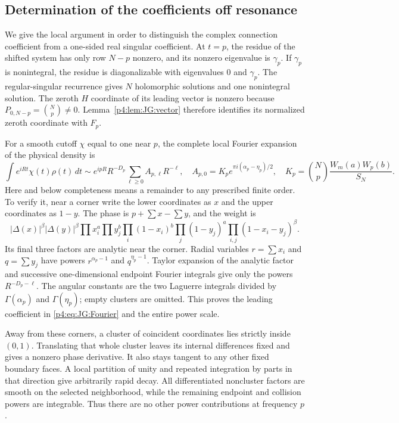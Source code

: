 \documentclass[11pt,a4paper]{article}
\theoremstyle{definition}
\theoremstyle{remark}
\numberwithin{equation}{section}
\begin{document}
\subsection{Determination of the coefficients off resonance}

We give the local argument in order to distinguish the complex
connection coefficient from a one-sided real singular coefficient.
At $t=p$, the residue of the shifted system has only row $N-p$
nonzero, and its nonzero eigenvalue is $\gamma_p$. If $\gamma_p$
is nonintegral, the residue is diagonalizable with eigenvalues
$0$ and $\gamma_p$. The regular-singular recurrence gives $N$
holomorphic solutions and one nonintegral solution.
The zeroth $H$ coordinate of its leading vector is nonzero because
$P_{0,N-p}=\binom Np\ne0$. Lemma~\ref{p4:lem:JG:vector} therefore
identifies its normalized zeroth coordinate with $F_p$.

For a smooth cutoff $\chi$ equal to one near $p$, the complete local
Fourier expansion of the physical density is
\begin{equation}\label{p4:eq:JG:Fourier}
 \int e^{iRt}\chi(t)\rho(t)\,dt
 \sim e^{ipR}R^{-D_p}\sum_{\ell\ge0}A_{p,\ell}R^{-\ell},
 \quad
 A_{p,0}=K_p e^{\pi i(\alpha_p-\eta_p)/2},
 \quad K_p=\binom Np\frac{W_m(a)W_p(b)}{S_N}.
\end{equation}
Here and below completeness means a remainder to any prescribed
finite order. To verify it, near a corner write the lower coordinates
as $x$ and the upper coordinates as $1-y$. The phase is
$p+\sum x-\sum y$, and the weight is
\[
 |\Delta(x)|^\beta|\Delta(y)|^\beta\prod x_i^a\prod y_j^b
 \prod_i(1-x_i)^b\prod_j(1-y_j)^a
                            \prod_{i,j}(1-x_i-y_j)^\beta.
\]
Its final three factors are analytic near the corner. Radial variables
$r=\sum x_i$ and $q=\sum y_j$ have powers $r^{\alpha_p-1}$ and
$q^{\eta_p-1}$. Taylor expansion of the analytic factor and successive
one-dimensional endpoint Fourier integrals give only the powers
$R^{-D_p-\ell}$. The angular constants are the two Laguerre integrals
divided by $\Gamma(\alpha_p)$ and $\Gamma(\eta_p)$; empty clusters
are omitted. This proves the leading coefficient in
\eqref{p4:eq:JG:Fourier} and the entire power scale.

Away from these corners, a cluster of coincident coordinates lies
strictly inside $(0,1)$. Translating that whole cluster leaves its
internal differences fixed and gives a nonzero phase derivative.
It also stays tangent to any other fixed boundary faces.
A local partition of unity and repeated integration by parts in
that direction give arbitrarily rapid decay. All differentiated
noncluster factors are smooth on the selected neighborhood, while
the remaining endpoint and collision powers are integrable.
Thus there are no other power contributions at frequency $p$.
\end{document}
